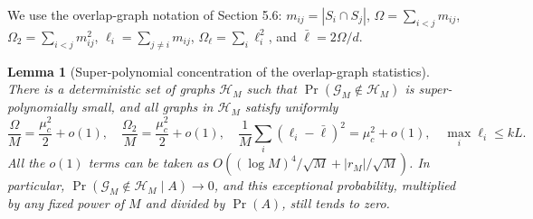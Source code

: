 \documentclass[a4paper,11pt]{article}
\newtheorem{lemma}[theorem]{Lemma}
\numberwithin{equation}{section}
\begin{document}
We use the overlap-graph notation of Section 5.6: $m_{ij}=|S_i\cap S_j|$, $\Omega=\sum_{i<j}m_{ij}$,
$\Omega_2=\sum_{i<j}m_{ij}^2$, $\ell_i=\sum_{j\ne i}m_{ij}$, $\Omega_\ell=\sum_i\ell_i^2$, and
$\bar\ell=2\Omega/d$.

\begin{lemma}[Super-polynomial concentration of the overlap-graph statistics]\label{F:lem:graph}
There is a deterministic set of graphs $\mathcal H_M$ such that $\Pr(\mathcal G_M\notin\mathcal H_M)$ is
super-polynomially small, and all graphs in $\mathcal H_M$ satisfy uniformly
\begin{equation}
\frac\Omega M=\frac{\mu_c^2}2+o(1),\quad\frac{\Omega_2}M=\frac{\mu_c^2}2+o(1),\quad\frac1M\sum_i(\ell_i-\bar\ell)^2=\mu_c^2+o(1),\quad\max_i\ell_i\le kL.\label{F:goodgraph}
\end{equation}
All the $o(1)$ terms can be taken as $O((\log M)^4/\sqrt M+|r_M|/\sqrt M)$. In particular,
$\Pr(\mathcal G_M\notin\mathcal H_M\mid A)\to0$, and this exceptional probability, multiplied by any fixed
power of $M$ and divided by $\Pr(A)$, still tends to zero.
\end{lemma}
\end{document}
